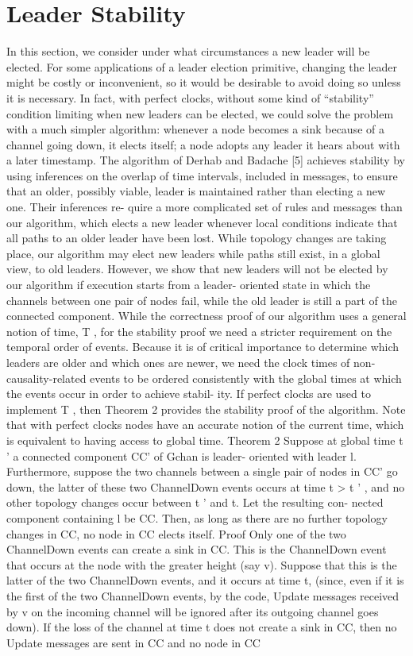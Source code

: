 \chapter{Leader Stability}

In this section, we consider under what circumstances a new leader will be elected. For some applications of a leader election primitive, changing the leader might be costly or inconvenient, so it would be desirable to avoid doing so unless it is necessary. In fact, with perfect clocks, without some kind of “stability” condition limiting when new leaders can be elected, we could solve the problem with a much simpler algorithm: whenever a node becomes a sink because of a channel going down, it elects itself; a node adopts any leader it hears about with a later timestamp. The algorithm of Derhab and Badache [5] achieves stability by using inferences on the overlap of time intervals, included in messages, to ensure that an older, possibly viable, leader is maintained rather than electing a new one. Their inferences re- quire a more complicated set of rules and messages than our algorithm, which elects a new leader whenever local conditions indicate that all paths to an older leader have been lost. While topology changes are taking place, our algorithm may elect new leaders while paths still exist, in a global view, to old leaders. However, we show that new leaders will not be elected by our algorithm if execution starts from a leader- oriented state in which the channels between one pair of nodes fail, while the old leader is still a part of the connected component. While the correctness proof of our algorithm uses a general notion of time, T , for the stability proof we need a stricter requirement on the temporal order of events. Because it is of critical importance to determine which leaders are older and which ones are newer, we need the clock times of non-causality-related events to be ordered consistently with the global times at which the events occur in order to achieve stabil- ity. If perfect clocks are used to implement T , then Theorem 2 provides the stability proof of the algorithm. Note that with perfect clocks nodes have an accurate notion of the current time, which is equivalent to having access to global time. Theorem 2 Suppose at global time t ' a connected component CC' of Gchan is leader- oriented with leader l. Furthermore, suppose the two channels between a single pair of nodes in CC' go down, the latter of these two ChannelDown events occurs at time t > t ' , and no other topology changes occur between t ' and t. Let the resulting con- nected component containing l be CC. Then, as long as there are no further topology changes in CC, no node in CC elects itself. Proof Only one of the two ChannelDown events can create a sink in CC. This is the ChannelDown event that occurs at the node with the greater height (say v). Suppose that this is the latter of the two ChannelDown events, and it occurs at time t, (since, even if it is the first of the two ChannelDown events, by the code, Update messages received by v on the incoming channel will be ignored after its outgoing channel goes down). If the loss of the channel at time t does not create a sink in CC, then no Update messages are sent in CC and no node in CC 
